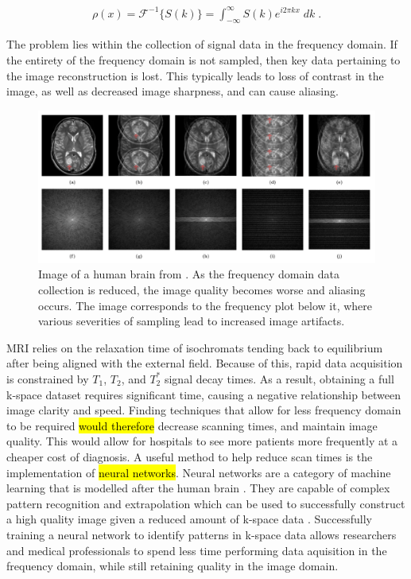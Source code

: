\documentclass[14pt]{extreport}
\begin{document}
        \begin{align}
            \rho(x) = \mathcal{F}^{-1}\{ S(k) \} = \int_{-\infty}^{\infty} S(k) e^{i 2\pi k x} \;dk\;. \label{fft}
        \end{align}

        The problem lies within the collection of signal data in the frequency domain. If the entirety of the frequency domain is not sampled, then key data pertaining to the image reconstruction is lost. This typically leads to loss of contrast in the image, as well as decreased image sharpness, and can cause aliasing. 
        
        \begin{figure}[h]
            \begin{center}
                \includegraphics[width = \linewidth]{Brain Images.png}
                \caption{Image of a human brain from \cite{Hyun_Kim_Lee_Lee_Seo_2018}. As the frequency domain data collection is reduced, the image quality becomes worse and aliasing occurs. The image corresponds to the frequency plot below it, where various severities of sampling lead to increased image artifacts.}
            \end{center}
        \end{figure}

        MRI relies on the relaxation time of isochromats tending back to equilibrium after being aligned with the external field. Because of this, rapid data acquisition is constrained by $T_1$, $T_2$, and $T_2^*$ signal decay times. As a result, obtaining a full k-space dataset requires significant time, causing a negative relationship between image clarity and speed. Finding techniques that allow for less frequency domain to be required \hl{would therefore} decrease scanning times, and maintain image quality. This would allow for hospitals to see more patients more frequently at a cheaper cost of diagnosis. A useful method to help reduce scan times is the implementation of \hl{neural networks}. Neural networks are a category of machine learning that is modelled after the human brain \cite{Pytorch_Book}. They are capable of complex pattern recognition and extrapolation which can be used to successfully construct a high quality image given a reduced amount of k-space data \cite{Hammernik_Klatzer_Kobler_Recht_Sodickson_Pock_Knoll_2018}. Successfully training a neural network to identify patterns in k-space data allows researchers and medical professionals to spend less time performing data aquisition in the frequency domain, while still retaining quality in the image domain.
    
\end{document}
